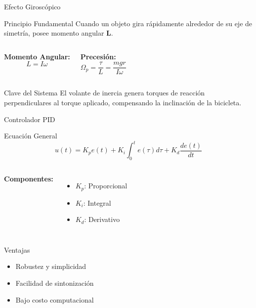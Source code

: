 \documentclass[10pt,xcolor={dvipsnames}]{beamer}
\begin{document}
\begin{frame}{Efecto Giroscópico}
\begin{block}{Principio Fundamental}
Cuando un objeto gira rápidamente alrededor de su eje de simetría, posee momento angular $\mathbf{L}$.
\end{block}

\begin{columns}
\textbf{Momento Angular:}
\begin{equation*}
L = I\omega
\end{equation*}

\textbf{Precesión:}
\begin{equation*}
\Omega_p = \frac{\tau}{L} = \frac{mgr}{I\omega}
\end{equation*}

\vspace{0.2cm}
\end{columns}

\vspace{0.3cm}
\begin{alertblock}{Clave del Sistema}
El volante de inercia genera torques de reacción perpendiculares al torque aplicado, compensando la inclinación de la bicicleta.
\end{alertblock}
\end{frame}

\begin{frame}{Controlador PID}
\begin{block}{Ecuación General}
\begin{equation*}
u(t) = K_p e(t) + K_i \int_{0}^{t} e(\tau)d\tau + K_d \frac{de(t)}{dt}
\end{equation*}
\end{block}

\begin{columns}
\textbf{Componentes:}
\begin{itemize}
    \item $K_p$: Proporcional
    \item $K_i$: Integral
    \item $K_d$: Derivativo
\end{itemize}

\vspace{0.2cm}
\end{columns}

\vspace{0.3cm}
\begin{block}{Ventajas}
\begin{itemize}
    \item Robustez y simplicidad
    \item Facilidad de sintonización
    \item Bajo costo computacional
\end{itemize}
\end{block}
\end{frame}
\end{document}
